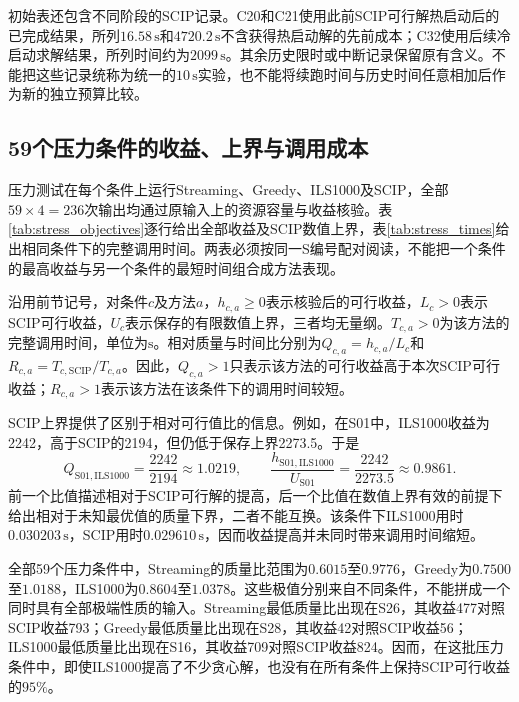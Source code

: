 初始表还包含不同阶段的SCIP记录。C20和C21使用此前SCIP可行解热启动后的已完成结果，所列$16.58\,\mathrm{s}$和$4720.2\,\mathrm{s}$不含获得热启动解的先前成本；C32使用后续冷启动求解结果，所列时间约为$2099\,\mathrm{s}$。其余历史限时或中断记录保留原有含义。不能把这些记录统称为统一的$10\,\mathrm{s}$实验，也不能将续跑时间与历史时间任意相加后作为新的独立预算比较。

\subsection{59个压力条件的收益、上界与调用成本}

压力测试在每个条件上运行Streaming、Greedy、ILS1000及SCIP，全部$59\times4=236$次输出均通过原输入上的资源容量与收益核验。表\ref{tab:stress_objectives}逐行给出全部收益及SCIP数值上界，表\ref{tab:stress_times}给出相同条件下的完整调用时间。两表必须按同一S编号配对阅读，不能把一个条件的最高收益与另一个条件的最短时间组合成方法表现。





沿用前节记号，对条件$c$及方法$a$，$h_{c,a}\geq0$表示核验后的可行收益，$L_c>0$表示SCIP可行收益，$U_c$表示保存的有限数值上界，三者均无量纲。$T_{c,a}>0$为该方法的完整调用时间，单位为$\mathrm{s}$。相对质量与时间比分别为$Q_{c,a}=h_{c,a}/L_c$和$R_{c,a}=T_{c,\mathrm{SCIP}}/T_{c,a}$。因此，$Q_{c,a}>1$只表示该方法的可行收益高于本次SCIP可行收益；$R_{c,a}>1$表示该方法在该条件下的调用时间较短。

SCIP上界提供了区别于相对可行值比的信息。例如，在S01中，ILS1000收益为2242，高于SCIP的2194，但仍低于保存上界2273.5。于是
\begin{equation}
 Q_{\mathrm{S01},\mathrm{ILS1000}}
 =\frac{2242}{2194}\approx1.0219,
 \qquad
 \frac{h_{\mathrm{S01},\mathrm{ILS1000}}}{U_{\mathrm{S01}}}
 =\frac{2242}{2273.5}\approx0.9861.
 \label{s0307:bound_example}
\end{equation}
前一个比值描述相对于SCIP可行解的提高，后一个比值在数值上界有效的前提下给出相对于未知最优值的质量下界，二者不能互换。该条件下ILS1000用时$0.030203\,\mathrm{s}$，SCIP用时$0.029610\,\mathrm{s}$，因而收益提高并未同时带来调用时间缩短。

全部59个压力条件中，Streaming的质量比范围为$0.6015$至$0.9776$，Greedy为$0.7500$至$1.0188$，ILS1000为$0.8604$至$1.0378$。这些极值分别来自不同条件，不能拼成一个同时具有全部极端性质的输入。Streaming最低质量比出现在S26，其收益477对照SCIP收益793；Greedy最低质量比出现在S28，其收益42对照SCIP收益56；ILS1000最低质量比出现在S16，其收益709对照SCIP收益824。因而，在这批压力条件中，即使ILS1000提高了不少贪心解，也没有在所有条件上保持SCIP可行收益的$95\%$。

